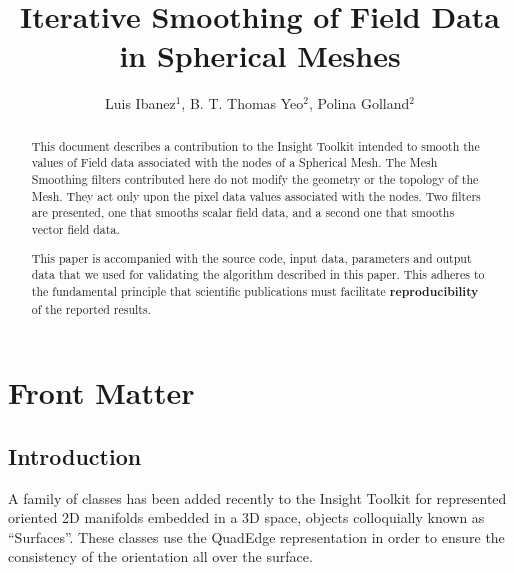 \documentclass{InsightArticle}
\title{Iterative Smoothing of Field Data\\ in Spherical Meshes}
\author{Luis Ibanez$^{1}$, B. T. Thomas Yeo$^{2}$, Polina Golland$^{2}$}
\newcommand{\IJhandlerIDnumber}{3091}
\begin{document}
%
% 
\IJhandlefooter{\IJhandlerIDnumber}


\ifpdf
\else
\fi


\maketitle


\ifhtml
\chapter*{Front Matter\label{front}}
\fi


\begin{abstract}
\noindent
This document describes a contribution to the Insight Toolkit intended to
smooth the values of Field data associated with the nodes of a Spherical Mesh.
The Mesh Smoothing filters contributed here do not modify the geometry or the
topology of the Mesh. They act only upon the pixel data values associated with
the nodes. Two filters are presented, one that smooths scalar field data, and a
second one that smooths vector field data.

This paper is accompanied with the source code, input data, parameters and
output data that we used for validating the algorithm described in this paper.
This adheres to the fundamental principle that scientific publications must
facilitate \textbf{reproducibility} of the reported results.
\end{abstract}

\tableofcontents

\section{Introduction}

A family of classes has been added recently to the Insight Toolkit for
represented oriented 2D manifolds embedded in a 3D space, objects colloquially
 known as ``Surfaces''. These classes use the QuadEdge representation in order
to ensure the consistency of the orientation all over the surface. 
\end{document}
